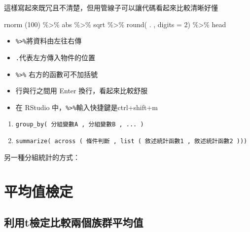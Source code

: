 \documentclass[
]{book}
\newenvironment{Shaded}{\begin{snugshade}}{\end{snugshade}}
\newcommand{\AttributeTok}[1]{\textcolor[rgb]{0.77,0.63,0.00}{#1}}
\newcommand{\DecValTok}[1]{\textcolor[rgb]{0.00,0.00,0.81}{#1}}
\newcommand{\FunctionTok}[1]{\textcolor[rgb]{0.00,0.00,0.00}{#1}}
\newcommand{\NormalTok}[1]{#1}
\newcommand{\SpecialCharTok}[1]{\textcolor[rgb]{0.00,0.00,0.00}{#1}}
\providecommand{\tightlist}{%
  \setlength{\itemsep}{0pt}\setlength{\parskip}{0pt}}
\begin{document}
這樣寫起來既冗且不清楚，但用管線子可以讓代碼看起來比較清晰好懂

\begin{Shaded}
\begin{Highlighting}[]
\FunctionTok{rnorm}\NormalTok{ (}\DecValTok{100}\NormalTok{) }\SpecialCharTok{\%\textgreater{}\%} 
\NormalTok{  abs }\SpecialCharTok{\%\textgreater{}\%} 
\NormalTok{  sqrt }\SpecialCharTok{\%\textgreater{}\%} 
  \FunctionTok{round}\NormalTok{( . , }\AttributeTok{digits =} \DecValTok{2}\NormalTok{) }\SpecialCharTok{\%\textgreater{}\%} 
\NormalTok{  head}
\end{Highlighting}
\end{Shaded}

\begin{itemize}
\tightlist
\item
  \texttt{\%\textgreater{}\%}將資料由左往右傳
\item
  \texttt{.}代表左方傳入物件的位置
\item
  \texttt{\%\textgreater{}\%} 右方的函數可不加括號
\item
  行與行之間用 Enter 換行，看起來比較舒服
\item
  在 RStudio 中，\texttt{\%\textgreater{}\%}輸入快捷鍵是ctrl+shift+m
\end{itemize}

\begin{enumerate}
\def\labelenumi{\arabic{enumi}.}
\setcounter{enumi}{1}
\item
  \texttt{group\_by(\ 分組變數A\ ,\ 分組變數B\ ,\ ...\ )}
\item
  \texttt{summarize(\ across\ (\ 條件判斷\ ,\ list\ (\ 敘述統計函數1\ ,\ 敘述統計函數2\ )))}
\end{enumerate}

另一種分組統計的方式：

\hypertarget{ux5e73ux5747ux503cux6aa2ux5b9a}{%
\chapter{平均值檢定}\label{ux5e73ux5747ux503cux6aa2ux5b9a}}

\hypertarget{ux5229ux7528tux6aa2ux5b9aux6bd4ux8f03ux5169ux500bux65cfux7fa4ux5e73ux5747ux503c}{%
\section{利用t檢定比較兩個族群平均值}\label{ux5229ux7528tux6aa2ux5b9aux6bd4ux8f03ux5169ux500bux65cfux7fa4ux5e73ux5747ux503c}}
\end{document}
